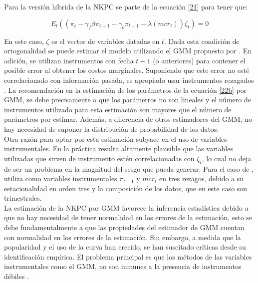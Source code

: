 Para la versión híbrida de la NKPC se parte de la ecuación \eqref{21} para tener que: 
 
\begin{equation}\label{22b}
E_{t}((\pi_{t}-\gamma_{f}\beta  \pi_{t+1}-\gamma_{b}\pi_{t-1}-\lambda(mcr_{t}))\zeta_{t})=0
\end{equation}

En este caso, $\zeta$ es el vector de variables datadas en $t$. Dada esta condición de ortogonalidad se puede estimar el modelo utilizando el  GMM propuesto por \cite{hansen1982generalized}.  En adición, se utilizan instrumentos con fecha $t-1$ (o anteriores) para contener el posible error al obtener los costos marginales. Suponiendo que este error no esté correlacionado con información pasada, es apropiado usar instrumentos rezagados \citep{gali2001european}.  La recomendación en la estimación de los parámetros de la ecuación \eqref{22b} por GMM, se debe precisamente a que los parámetros no son lineales y el número de instrumentos utilizado para esta estimación son mayores que el número de parámetros por estimar. Además, a diferencia de otros estimadores del GMM, no hay necesidad de suponer la distribución de probabilidad de los datos.\\%

Otra razón para optar por esta estimación subyace en el uso de variables instrumentales. En la práctica resulta altamente plausible que las variables utilizadas que sirven de instrumento estén correlacionadas con $\zeta_{t}$, lo cual no deja de ser un problema en la magnitud del sesgo que pueda generar. Para el caso de \cite{galvis2010estimacion}, utiliza como variables instrumentales $\pi_{t-1}$ y $mcr_{t}$ en tres rezagos, debido a su estacionalidad en orden tres y la composición de los datos, que en este caso son trimestrales.\\

La estimación de la NKPC por GMM favorece la inferencia estadística debido a que no hay necesidad de tener normalidad en los errores de la  estimación, esto se debe fundamentalmente a que las propiedades del estimador de GMM cuentan con normalidad en los errores de la estimación. Sin embargo, a medida que la popularidad y el uso de la curva han crecido, se han suscitado críticas desde su identificación empírica. El problema principal es que los métodos de las variables instrumentales  como el GMM, no son inmunes a la presencia de instrumentos débiles \citep{dufour2006inflation}.\\

